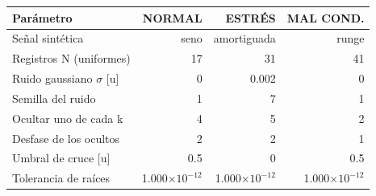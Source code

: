 {\footnotesize
\begin{longtable}{lrrr}
\toprule
\textbf{Parámetro} & \textbf{NORMAL} & \textbf{ESTRÉS} & \textbf{MAL COND.} \\
\midrule
\endhead
Señal sintética & seno & amortiguada & runge \\
Registros N (uniformes) & 17 & 31 & 41 \\
Ruido gaussiano $\sigma$ [u] & 0 & 0.002 & 0 \\
Semilla del ruido & 1 & 7 & 1 \\
Ocultar uno de cada k & 4 & 5 & 2 \\
Desfase de los ocultos & 2 & 2 & 1 \\
Umbral de cruce [u] & 0.5 & 0 & 0.5 \\
Tolerancia de raíces & 1.000$\times10^{-12}$ & 1.000$\times10^{-12}$ & 1.000$\times10^{-12}$ \\
\bottomrule
\end{longtable}
}
